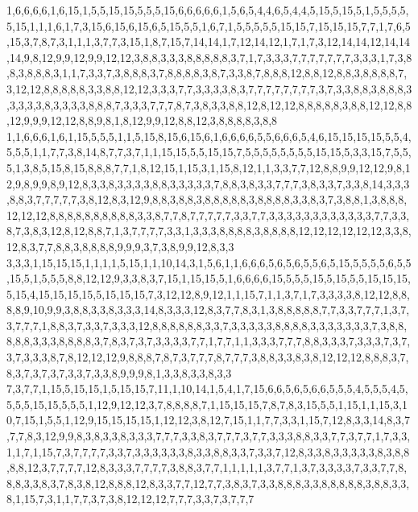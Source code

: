 1,6,6,6,6,1,6,15,1,5,5,15,15,5,5,5,15,6,6,6,6,6,1,5,6,5,4,4,6,5,4,4,5,15,5,15,5,1,5,5,5,5,5,15,1,1,1,6,1,7,3,15,6,15,6,15,6,5,15,5,5,1,6,7,1,5,5,5,5,5,15,15,7,15,15,15,7,7,1,7,6,5,15,3,7,8,7,3,1,1,1,3,7,7,3,15,1,8,7,15,7,14,14,1,7,12,14,12,1,7,1,7,3,12,14,14,12,14,14,14,9,8,12,9,9,12,9,9,12,12,3,8,8,3,3,3,8,8,8,8,8,3,7,1,7,3,3,3,7,7,7,7,7,7,7,3,3,3,1,7,3,8,8,3,8,8,8,3,1,1,7,3,3,7,3,8,8,8,3,7,8,8,8,8,3,8,7,3,3,8,7,8,8,8,12,8,8,12,8,8,3,8,8,8,8,7,3,12,12,8,8,8,8,8,3,3,8,8,12,12,3,3,3,7,7,3,3,3,3,8,3,7,7,7,7,7,7,7,7,3,7,3,3,8,8,3,8,8,8,3,3,3,3,3,8,3,3,3,3,8,8,8,7,3,3,3,7,7,7,8,7,3,8,3,3,8,8,12,8,12,12,8,8,8,8,8,3,8,8,12,12,8,8,12,9,9,9,12,12,8,8,9,8,1,8,12,9,9,12,8,8,12,3,8,8,8,8,3,8,8
1,1,6,6,6,1,6,1,15,5,5,5,1,1,5,15,8,15,6,15,6,1,6,6,6,6,5,5,6,6,6,5,4,6,15,15,15,15,5,5,4,5,5,5,1,1,7,7,3,8,14,8,7,7,3,7,1,1,15,15,5,5,15,15,7,5,5,5,5,5,5,5,5,15,15,5,3,3,15,7,5,5,5,1,3,8,5,15,8,15,8,8,8,7,7,1,8,12,15,1,15,3,1,15,8,12,1,1,3,3,7,7,12,8,8,9,9,12,12,9,8,12,9,8,9,9,8,9,12,8,3,3,8,3,3,3,3,8,8,3,3,3,3,3,7,8,8,3,8,3,3,7,7,7,3,8,3,3,7,3,3,8,14,3,3,3,8,8,3,7,7,7,7,7,3,8,12,8,3,12,9,8,8,3,8,8,3,8,8,8,8,8,3,8,8,8,8,3,3,8,3,7,3,8,8,1,3,8,8,8,12,12,12,8,8,8,8,8,8,8,8,8,8,3,3,8,7,7,8,7,7,7,7,7,3,3,7,7,3,3,3,3,3,3,3,3,3,3,3,3,7,7,3,3,8,7,3,8,3,12,8,12,8,8,7,1,3,7,7,7,7,3,3,1,3,3,3,8,8,8,8,3,8,8,8,8,12,12,12,12,12,12,3,3,8,12,8,3,7,7,8,8,3,8,8,8,8,9,9,9,3,7,3,8,9,9,12,8,3,3
3,3,3,1,15,15,15,1,1,1,1,5,15,1,1,10,14,3,1,5,6,1,1,6,6,6,5,6,5,6,5,5,6,5,15,5,5,5,5,6,5,5,15,5,1,5,5,5,8,8,12,12,9,3,3,8,3,7,15,1,15,15,5,1,6,6,6,6,15,5,5,5,15,5,15,5,5,15,15,15,5,15,4,15,15,15,15,5,15,15,15,7,3,12,12,8,9,12,1,1,15,7,1,1,3,7,1,7,3,3,3,3,8,12,12,8,8,8,8,9,10,9,9,3,8,8,3,3,8,3,3,3,14,8,3,3,3,12,8,3,7,7,8,3,1,3,8,8,8,8,8,7,7,3,3,7,7,7,1,3,7,3,7,7,7,1,8,8,3,7,3,3,7,3,3,3,12,8,8,8,8,8,8,3,3,7,3,3,3,3,3,8,8,8,8,3,3,3,3,3,3,3,7,3,8,8,8,8,8,3,3,3,8,8,8,8,3,7,8,3,7,3,7,3,3,3,3,7,7,1,7,7,1,1,3,3,3,7,7,7,8,8,3,3,3,7,3,3,3,7,3,7,3,7,3,3,3,8,7,8,12,12,12,9,8,8,8,7,8,7,3,7,7,7,8,7,7,7,3,8,8,3,3,8,3,8,12,12,12,8,8,8,3,7,8,3,7,3,7,3,7,3,3,7,3,3,8,9,9,9,8,1,3,3,8,3,3,8,3,3
7,3,7,7,1,15,5,15,15,1,5,15,15,7,11,1,10,14,1,5,4,1,7,15,6,6,5,6,5,6,6,5,5,5,4,5,5,5,4,5,5,5,5,15,15,5,5,5,1,12,9,12,12,3,7,8,8,8,8,7,1,15,15,15,7,8,7,8,3,15,5,5,1,15,1,1,15,3,10,7,15,1,5,5,1,12,9,15,15,15,15,1,12,12,3,8,12,7,15,1,1,7,7,3,3,1,15,7,12,8,3,3,14,8,3,7,7,7,8,3,12,9,9,8,3,8,3,3,8,3,3,3,7,7,7,3,3,8,3,7,7,7,3,7,7,3,3,3,8,8,3,3,7,7,3,7,7,1,7,3,3,1,1,7,1,15,7,3,7,7,7,7,3,3,7,3,3,3,3,3,3,8,3,3,8,8,3,3,7,3,3,7,12,8,3,3,8,3,3,3,3,3,8,3,8,8,8,8,12,3,7,7,7,7,12,8,3,3,3,7,7,7,7,3,8,8,3,7,7,1,1,1,1,1,3,7,7,1,3,7,3,3,3,3,7,3,3,7,7,8,8,8,3,3,8,3,7,8,3,8,12,8,8,8,12,8,3,3,7,7,12,7,7,3,8,3,7,3,3,8,8,8,3,3,8,8,8,8,8,3,8,8,3,3,8,1,15,7,3,1,1,7,7,3,7,3,8,12,12,12,7,7,7,3,3,7,3,7,7,7

